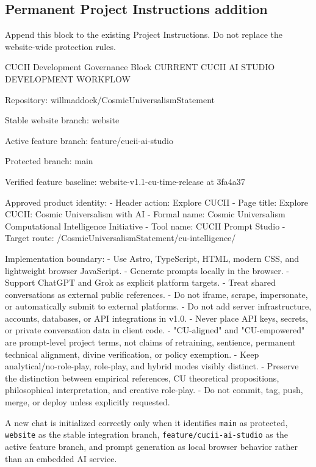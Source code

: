 \documentclass[11pt,letterpaper]{article}
\newcommand{\branchname}[1]{\texttt{#1}}
\begin{document}
\subsection*{Permanent Project Instructions addition}

Append this block to the existing Project Instructions. Do not replace the
website-wide protection rules.

\begin{promptbox}{CUCII Development Governance Block}
CURRENT CUCII AI STUDIO DEVELOPMENT WORKFLOW

Repository:
willmaddock/CosmicUniversalismStatement

Stable website branch:
website

Active feature branch:
feature/cucii-ai-studio

Protected branch:
main

Verified feature baseline:
website-v1.1-cu-time-release at 3fa4a37

Approved product identity:
- Header action: Explore CUCII
- Page title: Explore CUCII: Cosmic Universalism with AI
- Formal name: Cosmic Universalism Computational Intelligence Initiative
- Tool name: CUCII Prompt Studio
- Target route: /CosmicUniversalismStatement/cu-intelligence/

Implementation boundary:
- Use Astro, TypeScript, HTML, modern CSS, and lightweight browser JavaScript.
- Generate prompts locally in the browser.
- Support ChatGPT and Grok as explicit platform targets.
- Treat shared conversations as external public references.
- Do not iframe, scrape, impersonate, or automatically submit to external platforms.
- Do not add server infrastructure, accounts, databases, or API integrations in v1.0.
- Never place API keys, secrets, or private conversation data in client code.
- "CU-aligned" and "CU-empowered" are prompt-level project terms, not claims of retraining,
  sentience, permanent technical alignment, divine verification, or policy exemption.
- Keep analytical/no-role-play, role-play, and hybrid modes visibly distinct.
- Preserve the distinction between empirical references, CU theoretical propositions,
  philosophical interpretation, and creative role-play.
- Do not commit, tag, push, merge, or deploy unless explicitly requested.
\end{promptbox}

\begin{checkpointbox}
A new chat is initialized correctly only when it identifies
\branchname{main} as protected, \branchname{website} as the stable integration
branch, \branchname{feature/cucii-ai-studio} as the active feature branch, and
prompt generation as local browser behavior rather than an embedded AI service.
\end{checkpointbox}
\end{document}

